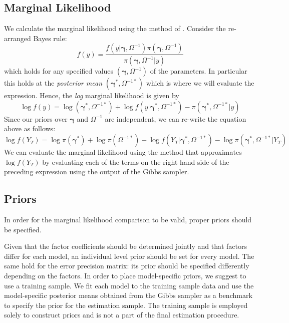 \subsection{Marginal Likelihood}
We calculate the marginal likelihood using the method of \cite{chib1995marginal}.
Consider the re-arranged Bayes rule:
\begin{equation*}
f(y) = \frac{f(y|\boldsymbol{\gamma},\Omega^{-1})\pi\left(\boldsymbol{\gamma}, \Omega^{-1}\right)}{\pi\left(\boldsymbol{\gamma}, \Omega^{-1}|y \right)}
\end{equation*}
which holds for any specified values $(\boldsymbol{\gamma},\Omega^{-1})$ of the parameters.
In particular this holds at the \emph{posterior mean} $(\boldsymbol{\gamma}^*,\Omega^{-1*})$ which is where we will evaluate the expression.
Hence, the \emph{log} marginal likelihood is given by
\begin{equation*}
\log{f(y)} =  \log \left(\boldsymbol{\gamma}^*, \Omega^{-1*}\right) + \log{f(y|\boldsymbol{\gamma}^*,\Omega^{-1*})} - \pi\left(\boldsymbol{\gamma}^*, \Omega^{-1*}|y \right)
\end{equation*}
Since our priors over $\boldsymbol{\gamma}$ and $\Omega^{-1}$ are independent, we can re-write the equation above as follows:
\begin{equation*}
\log f(Y_T) = \log \pi(\boldsymbol{\gamma}^*) + \log \pi\left( \Omega^{-1*} \right) + \log f\left( Y_T|\boldsymbol{\gamma}^*, \Omega^{-1*} \right) - \log \pi\left( \boldsymbol{\gamma}^*, \Omega^{-1*}|Y_T \right)
\end{equation*}
We can evaluate the marginal likelihood using the \cite{chib1995marginal} method that approximates $\log f(Y_T)$ by evaluating each of the terms on the right-hand-side of the preceding expression using the output of the Gibbs sampler.

\subsection{Priors}
In order for the marginal likelihood comparison to be valid, proper priors should be specified. 

Given that the factor coefficients should be determined jointly and that factors differ for each model, an individual level prior should be set for every model.
The same hold for the error precision matrix: its prior should be specified differently depending on the factors.   
In order to place model-specific priors, we suggest to use a training sample.
We fit each model to the training sample data and use the model-specific posterior means obtained from the Gibbs sampler as a benchmark to specify the prior for the estimation sample. 
The training sample is employed solely to construct priors and is not a part of the final estimation procedure. 

